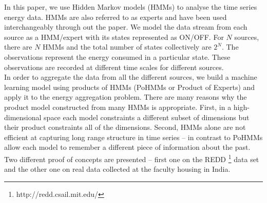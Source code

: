 \documentclass{acm_proc_article-sp}
\begin{document}
In this paper, we use Hidden Markov models (HMMs) to analyse the time series energy data. HMMs are also referred to as experts and have been used interchangeably through out the paper.
We model the data stream from each source as a HMM/expert with its states represented as ON/OFF.  For $N$ sources, there are $N$ HMMs and  the total number of states collectively are $2^N$. The observations represent the energy consumed in a particular state. These observations are recorded at different time scales for different sources. \\
In order to aggregate the data from all the different sources, we build a machine learning model using products of HMMs (PoHMMs or Product of Experts) and apply it to the energy aggregation problem. There are many reasons why the product model constructed from many HMMs is appropriate. 
First, in a high-dimensional space each model constraints a different subset of dimensions but their product constraints all of the dimensions.
Second, HMMs alone are not efficient at capturing long range structure in time series \cite{Taylor} -- in contrast to PoHMMs  \cite{andrew} allow each model to remember a different piece of information about the past.
Two different proof of concepts are presented -- first one on the REDD \footnote{http://redd.csail.mit.edu/} data set and the other one on real data collected at the faculty housing in India. 

\end{document}
